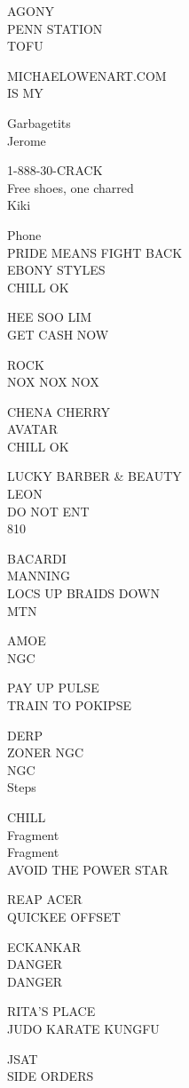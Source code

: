 \documentclass[10pt,letterpaper]{article}
\begin{document}
AGONY\\
PENN STATION\\
TOFU

MICHAELOWENART.COM\\
IS MY

Garbagetits\\
Jerome

1{-}888{-}30{-}CRACK\\
Free shoes, one charred\\
Kiki

Phone\\
PRIDE MEANS FIGHT BACK\\
EBONY STYLES\\
CHILL OK

HEE SOO LIM\\
GET CASH NOW

ROCK\\
NOX NOX NOX

CHENA CHERRY\\
AVATAR\\
CHILL OK

LUCKY BARBER \& BEAUTY\\
LEON\\
DO NOT ENT\\
810

BACARDI\\
MANNING\\
LOCS UP BRAIDS DOWN\\
MTN

AMOE\\
NGC

PAY UP PULSE\\
TRAIN TO POKIPSE

DERP\\
ZONER NGC\\
NGC\\
Steps

CHILL\\
Fragment\\
Fragment\\
AVOID THE POWER STAR

REAP ACER\\
QUICKEE OFFSET

ECKANKAR\\
DANGER\\
DANGER

RITA'S PLACE\\
JUDO KARATE KUNGFU

JSAT\\
SIDE ORDERS
\end{document}

